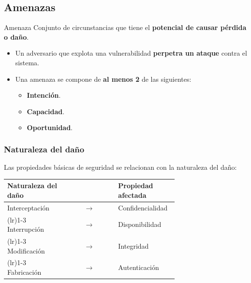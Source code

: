 \documentclass[11pt,a4paper]{report}
\begin{document}
\subsection{Amenazas}

\begin{definicion}{Amenaza}
Conjunto de circunstancias que tiene el \textbf{potencial de causar pérdida o daño}.
\end{definicion}

\begin{itemize}
  \item Un adversario que explota una vulnerabilidad \textbf{perpetra un ataque} contra el sistema.
  \item Una amenaza se compone de \textbf{al menos 2} de las siguientes:
    \begin{itemize}
      \item \textbf{Intención}.
      \item \textbf{Capacidad}.
      \item \textbf{Oportunidad}.
    \end{itemize}
\end{itemize}

\subsubsection*{Naturaleza del daño}

Las propiedades básicas de seguridad se relacionan con la naturaleza del daño:

\begin{importante}
\begin{center}
\renewcommand{\arraystretch}{1.35}
\begin{tabular}{p{0.35\linewidth} c p{0.35\linewidth}}
\toprule
\textbf{Naturaleza del daño} & & \textbf{Propiedad afectada} \\
\midrule
Interceptación & $\to$ & Confidencialidad \\ \arrayrulecolor{gray!45}\cmidrule[0.2pt](lr){1-3}\arrayrulecolor{black}
Interrupción & $\to$ & Disponibilidad \\ \arrayrulecolor{gray!45}\cmidrule[0.2pt](lr){1-3}\arrayrulecolor{black}
Modificación & $\to$ & Integridad \\ \arrayrulecolor{gray!45}\cmidrule[0.2pt](lr){1-3}\arrayrulecolor{black}
Fabricación & $\to$ & Autenticación \\
\bottomrule
\end{tabular}
\end{center}
\end{importante}
\end{document}
